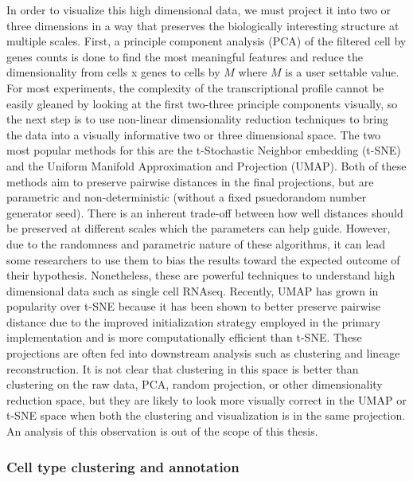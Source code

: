 \par{
In order to visualize this high dimensional data, we must project it into two or three dimensions in a way that preserves the biologically interesting structure at multiple scales. First, a principle component analysis (PCA) of the filtered cell by genes counts is done to find the most meaningful features and reduce the dimensionality from cells x genes to cells by $M$ where $M$ is a user settable value\cite{pcaimpl}. For most experiments, the complexity of the transcriptional profile cannot be easily gleaned by looking at the first two-three principle components visually, so the next step is to use non-linear dimensionality reduction techniques to bring the data into a visually informative two or three dimensional space. The two most popular methods for this are the t-Stochastic Neighbor embedding (t-SNE)\cite{tsne1}\cite{tsne2}\cite{hinton} and the Uniform Manifold Approximation and Projection (UMAP)\cite{umap1}. Both of these methods aim to preserve pairwise distances in the final projections, but are parametric and non-deterministic (without a fixed psuedorandom number generator seed). There is an inherent trade-off between how well distances should be preserved at different scales which the parameters can help guide. However, due to the randomness and parametric nature of these algorithms, it can lead some researchers to use them to bias the results toward the expected outcome of their hypothesis. Nonetheless, these are powerful techniques to understand high dimensional data such as single cell RNAseq. Recently, UMAP has grown in popularity over t-SNE because it has been shown to better preserve pairwise distance due to the improved initialization strategy employed in the primary implementation and is more computationally efficient than t-SNE\cite{umap2}\cite{umap3}. These projections are often fed into downstream analysis such as clustering and lineage reconstruction. It is not clear that clustering in this space is better than clustering on the raw data, PCA, random projection\cite{randomproject}, or other dimensionality reduction space, but they are likely to look more visually correct in the UMAP or t-SNE space when both the clustering and visualization is in the same projection. An analysis of this observation is out of the scope of this thesis.
}


\subsubsection{Cell type clustering and annotation}

